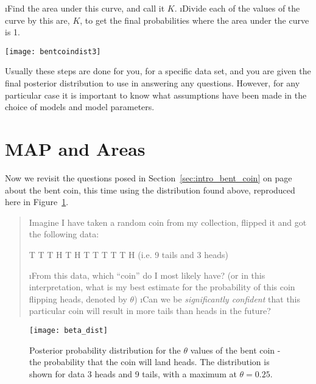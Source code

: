 \i Find the area under this curve, and call it $K$.
\i Divide each of the values of the curve by this are, $K$, to get the final probabilities where the area under the curve is 1.
\begin{marginfigure}
\texttt{[image: bentcoindist3]}
\end{marginfigure}
\ee

Usually these steps are done for you, for a specific data set, and you are given the final posterior distribution to use in answering any questions.  However, for any particular case it is important to know what assumptions have been made in the choice of models and model parameters.  

\section{MAP and Areas}

Now we revisit the questions posed in Section~\ref{sec:intro_bent_coin} on page~\pageref{sec:intro_bent_coin} about the bent coin, this time using the distribution found above, reproduced here in Figure~\ref{fig:coin_12_3_posterior}.

\begin{quote}
Imagine I have taken a random coin from my collection, flipped it and got the following data:
\begin{center}
T T T H T H T T T T T H (i.e. 9 tails and 3 heads)
\end{center}
\be
\i From this data, which ``coin'' do I most likely have? (or in this interpretation, what is my best estimate for the probability of this coin flipping heads, denoted by $\theta$)
\i Can we be {\em significantly confident} that this particular coin will result in more tails than heads in the future?
\ee
\end{quote}

\begin{figure}
\texttt{[image: beta\_dist]}
\caption{Posterior probability distribution for the $\theta$ values of the bent coin - the probability that the coin will land heads.  The distribution is shown for data 3 heads and 9 tails, with a maximum at $\theta=0.25$.}
\label{fig:coin_12_3_posterior}
\end{figure}

